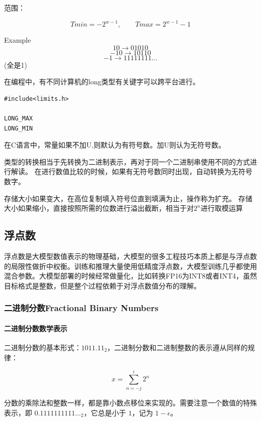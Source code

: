 范围：

\[
Tmin = -2^{w-1} , \qquad
Tmax = 2 ^{w-1} - 1
\]

\begin{fancybox}{Example}
\[10 \to 01010\]
\[-10 \to 10110 \]
\[-1 \to 11111111...\](全是1)
\end{fancybox}

在编程中，有不同计算机的long类型有关键字可以跨平台进行。

\begin{lstlisting}[style=MyCppStyle]
#include<limits.h>

LONG_MAX
LONG_MIN

\end{lstlisting}

在C语言中，常量如果不加U,则默认为有符号数。加U则认为无符号数。

类型的转换相当于先转换为二进制表示，再对于同一个二进制串使用不同的方式进行解读。
在进行数值比较的时候，如果有无符号数同时出现，自动转换为无符号数字。

存储大小如果变大，在高位复制填入符号位直到填满为止，操作称为扩充。
存储大小如果缩小，直接按照所需的位数进行溢出截断，相当于对$2^n$进行取模运算

\subsection{浮点数}

浮点数是大模型数值表示的物理基础，大模型的很多工程技巧本质上都是与浮点数的局限性做折中权衡。训练和推理大量使用低精度浮点数，大模型训练几乎都使用混合参数。大模型部署的时候经常做量化，比如转换FP16为INT8或者INT4，虽然目标格式是整数，但是整个过程依赖于对浮点数值分布的理解。

\subsubsection{二进制分数Fractional Binary Numbers}

\paragraph{二进制分数数学表示}

二进制分数的基本形式：$1011.11_2$，二进制分数和二进制整数的表示遵从同样的规律：

\[
x = \sum_{n = -j}^{i} 2^n 
\]

{\sloppy 分数的乘除法和整数一样，都是靠小数点移位来实现的。需要注意一个数值的特殊表示，即 $0.1111111111\ldots_2$，它总是小于 $1$，记为 $1 - \epsilon$。\par}

